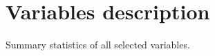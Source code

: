 \documentclass[main.tex]{subfiles}
\begin{document}
\section{Variables description}


\begin{table}[htbp]
\centering
\tiny{
}
\caption{Summary statistics of all selected variables.}
\end{table}
\end{document}
